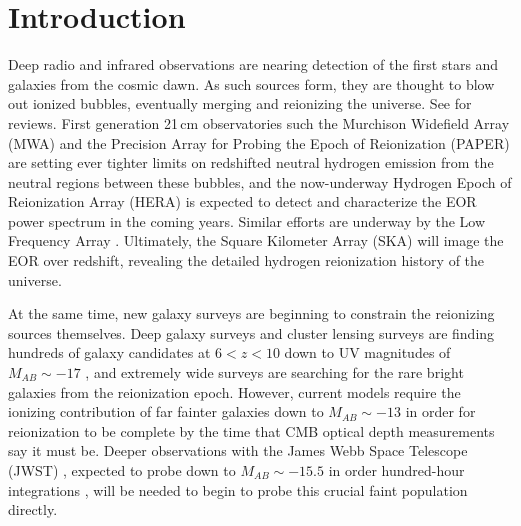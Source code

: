 \documentclass[numberedappendix]{emulateapj}
\begin{document}

\section{Introduction}

Deep radio and infrared observations are nearing detection of the first stars and galaxies from the cosmic dawn. As such sources form, they are thought to blow out ionized bubbles, eventually merging and reionizing the universe. See \citet{FurlanettoReview,miguelreview,PritchardLoebReview,Mesinger16} for reviews. First generation 21\,cm observatories such the Murchison Widefield Array (MWA) \citep{tingay13,mwascience} and the Precision Array for Probing the Epoch of Reionization (PAPER) \citep{parsons14,ali15,PoberPAPER64Heating,DannyMultiRedshift} are setting ever tighter limits on redshifted neutral hydrogen emission from the neutral regions between these bubbles, and the now-underway Hydrogen Epoch of Reionization Array (HERA) \citep{deboer16,neben16b,ewallwice16,patra16} is expected to detect and characterize the EOR power spectrum in the coming years. Similar efforts are underway by the Low Frequency Array \citep{lofareorpaper,lofar}. Ultimately, the Square Kilometer Array (SKA)  \citep{ska,ska1,ska2,ska3} will image the EOR over redshift, revealing the detailed hydrogen reionization history of the universe. 

At the same time, new galaxy surveys are beginning to constrain the reionizing sources themselves. Deep galaxy surveys \citep{Bowler2017,Roberts-Borsani2016,Bowler2015,Wilkins12015,Bouwens2015,Bouwens2013,Dunlop2013,Illingworth2013,Ellis2013,Robertson2013,Oesch2013,Grogin2011,Bouwens2011} and cluster lensing surveys \citep{Livermore2016,Ebeling2016,McLeod2016,Bouwens2016,Bouwens2016a,Coe2015,Huang2015,McLeod2015,Atek2015} are finding hundreds of galaxy candidates at $6<z<10$ down to UV magnitudes of $M_{AB}\sim-17$ \citep{Finkelstein2015}, and extremely wide surveys are searching for the rare bright galaxies \citep{Bernard2016,Calvi,Schmidt2014,Bradley2012,Trenti2011} from the reionization epoch. However, current models require the ionizing contribution of far fainter galaxies down to $M_{AB}\sim-13$ \citep{Bouwens2016b,Alvarez2012} in order for reionization to be complete by the time that CMB optical depth measurements \citep{planck16} say it must be. Deeper observations with the James Webb Space Telescope (JWST) \citep{Gardner2006}, expected to probe down to $M_{AB}\sim-15.5$ in order hundred-hour integrations \citep{Finkelstein2015}, will be needed to begin to probe this crucial faint population directly.
\end{document}
